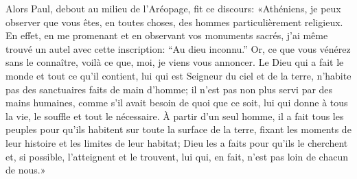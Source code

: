 Alors Paul, debout au milieu de l’Aréopage, fit ce discours:
	«Athéniens, je peux observer que vous êtes, en toutes choses,
	des hommes particulièrement religieux.
En effet, en me promenant et en observant vos monuments sacrés,
	j’ai même trouvé un autel avec cette inscription:
	“Au dieu inconnu.”
Or, ce que vous vénérez sans le connaître,
	voilà ce que, moi, je viens vous annoncer.
Le Dieu qui a fait le monde et tout ce qu’il contient,
	lui qui est Seigneur du ciel et de la terre,
	n’habite pas des sanctuaires faits de main d’homme;
	il n’est pas non plus servi par des mains humaines,
	comme s’il avait besoin de quoi que ce soit,
	lui qui donne à tous la vie, le souffle et tout le nécessaire.
À partir d’un seul homme, il a fait tous les peuples
	pour qu’ils habitent sur toute la surface de la terre,
	fixant les moments de leur histoire et les limites de leur habitat;
	Dieu les a faits pour qu’ils le cherchent
	et, si possible, l’atteignent et le trouvent,
	lui qui, en fait, n’est pas loin de chacun de nous.»
